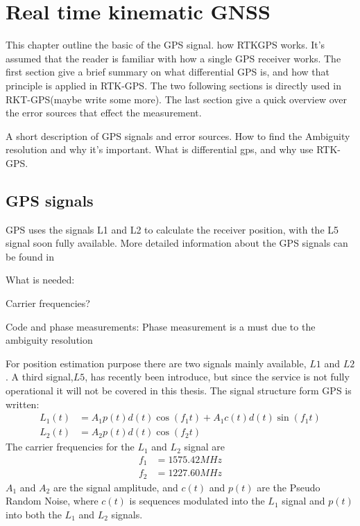 
\chapter{Real time kinematic GNSS}
This chapter outline the basic of the GPS signal. how RTKGPS works. It's assumed that the reader is familiar with how a single GPS receiver works. The first section give a brief summary on what differential GPS is, and how that principle is applied in RTK-GPS. The two following sections is directly used in RKT-GPS(maybe write some more). The last section give a quick overview over the error sources that effect the measurement.

A short description of GPS signals and error sources. How to find the Ambiguity resolution and why it's important. What is differential gps, and why use RTK-GPS.


\section{GPS signals}
GPS uses the signals L1 and L2 to calculate the receiver position, with the L5 signal soon fully available. More detailed information about the GPS signals can be found in 

What is needed:

Carrier frequencies?

Code and phase measurements: Phase measurement is a must due to the ambiguity resolution

For position estimation purpose there are two signals mainly available, $L1$ and $L2$. A third signal,$L5$, has recently been introduce, but since the service is not fully operational it will not be covered in this thesis. The signal structure form GPS is written:
\begin{align*}
L_1(t) &= A_1p(t)d(t)\cos(f_1t) + A_1c(t)d(t)\sin(f_1t) \\
L_2(t) &= A_2p(t)d(t)\cos(f_2t)
\end{align*}
The carrier frequencies for the $L_1$ and $ L_2$ signal are
\begin{align*}
f_1 &= 1575.42 MHz \\
f_2 &= 1227.60 MHz
\end{align*}
$A_1$ and $A_2$ are the signal amplitude, and $c(t)$ and $p(t)$ are the Pseudo Random Noise, where $c(t)$ is sequences modulated into the $L_1$ signal and $p(t)$ into both the $L_1$ and $L_2$ signals.

